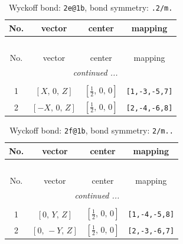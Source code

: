 \documentclass[fleqn,8pt]{jsarticle}
\begin{document}
\renewcommand{\arraystretch}{1.2}
\begin{longtable}{cccc}
\caption{Wyckoff bond: {\tt 2e@1b}, bond symmetry: {\tt .2/m.}}
 \\
 \hline \hline
No. & vector & center & mapping \\ \hline \endfirsthead

\multicolumn{3}{l}{\tablename\ \thetable{}} \\
 \hline \hline
No. & vector & center & mapping \\ \hline \endhead

 \hline \hline
\multicolumn{3}{r}{\footnotesize\it continued ...} \\ \endfoot

 \hline \hline
\multicolumn{3}{r}{} \\ \endlastfoot

1 & $\left[ X,\, 0,\, Z \right]$ & $\left[ \frac{1}{2},\, 0,\, 0 \right]$ & {\tt [1,-3,-5,7]} \\ \hline
2 & $\left[ - X,\, 0,\, Z \right]$ & $\left[ \frac{1}{2},\, 0,\, 0 \right]$ & {\tt [2,-4,-6,8]} \\
\end{longtable}
\renewcommand{\arraystretch}{1.2}
\begin{longtable}{cccc}
\caption{Wyckoff bond: {\tt 2f@1b}, bond symmetry: {\tt 2/m..}}
 \\
 \hline \hline
No. & vector & center & mapping \\ \hline \endfirsthead

\multicolumn{3}{l}{\tablename\ \thetable{}} \\
 \hline \hline
No. & vector & center & mapping \\ \hline \endhead

 \hline \hline
\multicolumn{3}{r}{\footnotesize\it continued ...} \\ \endfoot

 \hline \hline
\multicolumn{3}{r}{} \\ \endlastfoot

1 & $\left[ 0,\, Y,\, Z \right]$ & $\left[ \frac{1}{2},\, 0,\, 0 \right]$ & {\tt [1,-4,-5,8]} \\ \hline
2 & $\left[ 0,\, - Y,\, Z \right]$ & $\left[ \frac{1}{2},\, 0,\, 0 \right]$ & {\tt [2,-3,-6,7]} \\
\end{longtable}
\renewcommand{\arraystretch}{1.2}
\end{document}
